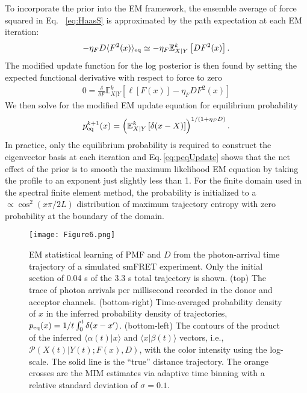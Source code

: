 \documentclass[journal=jpcbfk,manuscript=article,layout=twocolumn,articletitle=true]{achemso}
\begin{document}
To incorporate the prior into the EM framework, the ensemble average of force squared in Eq. \, \ref{eq:HaasS} is approximated by the path expectation at each EM iteration:
\begin{align}
 -\eta_F D\langle F^2(x) \rangle_{\rm{eq}} \simeq  - \eta_F \mathbb{E}^k_{X|Y} \left[DF^2(x) \right].
\end{align}
The modified update function for the log posterior is then found by setting the expected functional derivative with respect to force to zero
\begin{align}
0 = \frac{\delta}{\delta F} \mathbb{E}^k_{X|Y}  \left[ \ell[F(x)] - \eta_F D F^2(x)  \right ]
\end{align}
We then solve for the modified EM update equation for equilibrium probability\begin{align}
\label{eq:peqUpdate}
p_{\rm eq}^{k+1}(x)=\left(\mathbb{E}^k_{X|Y} \left[\delta(x-X) \right]\right)^{1/(1+\eta_FD)}.
\end{align}
In practice, only the equilibrium probability is required to construct the eigenvector basis at each iteration and Eq.\,\ref{eq:peqUpdate} shows that the net effect of the prior is to smooth the maximum likelihood EM equation by taking the profile to an exponent just slightly less than 1.  For the finite domain used in the spectral finite element method, the probability is initialized to a $\propto \cos^2(x\pi/2L)$ distribution of maximum trajectory entropy with zero probability at the boundary of the domain.

\begin{figure}[t!]
\centering
\texttt{[image: Figure6.png]}
\caption[Contours of optimized trajectory from smFRET]{\label{fig:InferTrajopt} EM statistical learning of PMF and $D$ from the photon-arrival time trajectory of a simulated smFRET experiment. Only the initial section of 0.04 s of the 3.3 s total trajectory is shown. (top) The trace of photon arrivals per millisecond recorded in the donor and acceptor channels. (bottom-right) Time-averaged probability density of $x$ in the inferred probability density of trajectories, $p_{\rm{eq}}(x) = 1/t \int_0^{t} \delta(x - x')$. (bottom-left)  The contours of the product of the inferred $\langle \alpha(t) | x \rangle$ and $\langle x | \beta(t) \rangle$ vectors, i.e., $\mathcal{P}(X(t)|Y(t); F(x), D)$, with the color intensity using the log-scale. The solid line is the ``true'' distance trajectory. The orange crosses are the MIM estimates via adaptive time binning with a relative standard deviation of $\sigma=0.1$.\cite{Watkins:2004cia,Watkins:2006bu}}
\end{figure}
\end{document}
